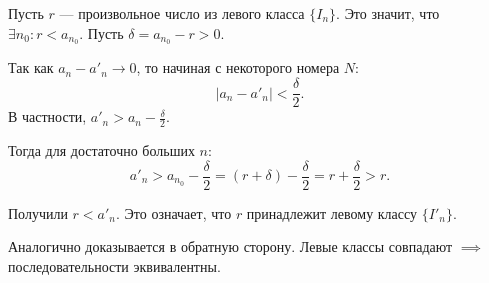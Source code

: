 \begin{tcolorbox}[title=Доказательство Теоремы, breakable]
    Пусть $r$ — произвольное число из левого класса $\{I_n\}$.
    Это значит, что $\exists n_0: r < a_{n_0}$.
    Пусть $\delta = a_{n_0} - r > 0$.
    
    Так как $a_n - a'_n \to 0$, то начиная с некоторого номера $N$:
    \[ |a_n - a'_n| < \frac{\delta}{2}. \]
    В частности, $a'_n > a_n - \frac{\delta}{2}$.
    
    Тогда для достаточно больших $n$:
    \[ a'_n > a_{n_0} - \frac{\delta}{2} = (r + \delta) - \frac{\delta}{2} = r + \frac{\delta}{2} > r. \]
    
    Получили $r < a'_n$. Это означает, что $r$ принадлежит левому классу $\{I'_n\}$.
    
    Аналогично доказывается в обратную сторону.
    Левые классы совпадают $\implies$ последовательности эквивалентны.
\end{tcolorbox}

